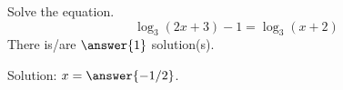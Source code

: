 \documentclass{ximera}
\author{Bobby Ramsey}
\begin{document}
\begin{exercise}
	Solve the equation.
	\[ \log_3(2x+3) - 1 = \log_3(x+2) \]
	There is/are $\answer{1}$ solution(s).
	\begin{exercise}
		Solution: $x = \answer{-1/2 }$.
	\end{exercise}
\end{exercise}
\end{document}
